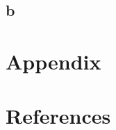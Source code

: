 {\subsection{b}












\newpage
\section{Appendix}
\section{References}
\begingroup
\renewcommand{\section}[2]{}%


\endgroup



 








